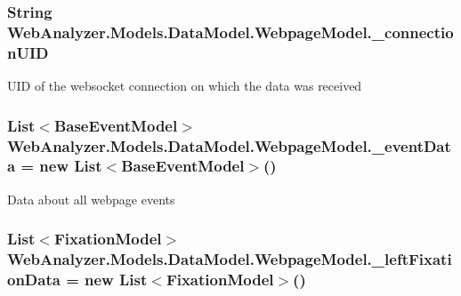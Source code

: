\subsubsection[{\+\_\+connection\+U\+I\+D}]{\setlength{\rightskip}{0pt plus 5cm}String Web\+Analyzer.\+Models.\+Data\+Model.\+Webpage\+Model.\+\_\+connection\+U\+I\+D\hspace{0.3cm}{\ttfamily [private]}}\label{class_web_analyzer_1_1_models_1_1_data_model_1_1_webpage_model_af8a807db15e54cbc83463f814c6b4f59}


U\+I\+D of the websocket connection on which the data was received 

\hypertarget{class_web_analyzer_1_1_models_1_1_data_model_1_1_webpage_model_a6f183590ba34744b4cec4c8cfb126af5}{}
\subsubsection[{\+\_\+event\+Data}]{\setlength{\rightskip}{0pt plus 5cm}List$<${\bf Base\+Event\+Model}$>$ Web\+Analyzer.\+Models.\+Data\+Model.\+Webpage\+Model.\+\_\+event\+Data = new List$<${\bf Base\+Event\+Model}$>$()\hspace{0.3cm}{\ttfamily [private]}}\label{class_web_analyzer_1_1_models_1_1_data_model_1_1_webpage_model_a6f183590ba34744b4cec4c8cfb126af5}


Data about all webpage events 

\hypertarget{class_web_analyzer_1_1_models_1_1_data_model_1_1_webpage_model_aeef627527c26ccf4d8caa6e65101970f}{}
\subsubsection[{\+\_\+left\+Fixation\+Data}]{\setlength{\rightskip}{0pt plus 5cm}List$<${\bf Fixation\+Model}$>$ Web\+Analyzer.\+Models.\+Data\+Model.\+Webpage\+Model.\+\_\+left\+Fixation\+Data = new List$<${\bf Fixation\+Model}$>$()\hspace{0.3cm}{\ttfamily [private]}}\label{class_web_analyzer_1_1_models_1_1_data_model_1_1_webpage_model_aeef627527c26ccf4d8caa6e65101970f}


